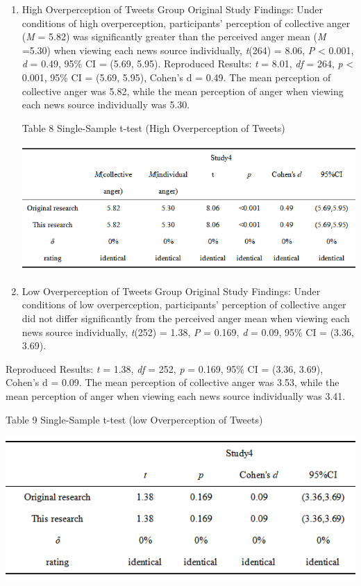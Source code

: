 \documentclass[
  man]{apa6}
\providecommand{\tightlist}{%
  \setlength{\itemsep}{0pt}\setlength{\parskip}{0pt}}
\begin{document}
\begin{enumerate}
\def\labelenumi{\arabic{enumi}.}
\setcounter{enumi}{1}
\tightlist
\item
  High Overperception of Tweets Group
  Original Study Findings: Under conditions of high overperception, participants' perception of
  collective anger (\emph{M} = 5.82) was significantly greater than the perceived anger mean (\emph{M} =5.30)
  when viewing each news source individually, \emph{t}(264) = 8.06, \emph{P} \textless{} 0.001, \emph{d} = 0.49, 95\% CI = (5.69, 5.95).
  Reproduced Results: \emph{t} = 8.01, \emph{df} = 264, \emph{p} \textless{} 0.001, 95\% CI = (5.69, 5.95), Cohen's d = 0.49. The mean perception of collective anger was 5.82, while the mean perception of anger when viewing each news source individually was 5.30.

  \begin{center}
  Table 8 Single-Sample t-test (High Overperception of Tweets)
  \end{center}
  \begin{center}
  \includegraphics{study4_Single-Sample_high.png}
  \end{center}
\item
  Low Overperception of Tweets Group
  Original Study Findings: Under conditions of low overperception, participants' perception of collective anger did not differ significantly from the perceived anger mean when viewing each news source individually, \emph{t}(252) = 1.38, \emph{P} = 0.169, \emph{d} = 0.09, 95\% CI = (3.36, 3.69).
\end{enumerate}

Reproduced Results: \emph{t} = 1.38, \emph{df} = 252, \emph{p} = 0.169, 95\% CI = (3.36, 3.69), Cohen's d = 0.09. The mean perception of collective anger was 3.53, while the mean perception of anger when viewing each news source individually was 3.41.

\begin{center}
Table 9 Single-Sample t-test (low Overperception of Tweets)
\end{center}
\begin{center}
\includegraphics{study4_Single-Sample_low.png}
\end{center}
\end{document}
